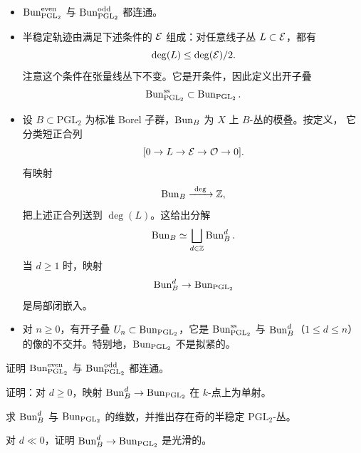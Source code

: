 \begin{itemize}
\item \(\operatorname{Bun}_{\mathrm{PGL}_2}^{\mathrm{even}}\) 与 \(\operatorname{Bun}_{\mathrm{PGL}_2}^{\mathrm{odd}}\) 都连通。
\item 半稳定轨迹由满足下述条件的 \(\mathcal{E}\) 组成：对任意线子丛 \(L\subset\mathcal{E}\)，都有
\[
\deg(L)\le\deg(\mathcal{E})/2.
\]
注意这个条件在张量线丛下不变。它是开条件，因此定义出开子叠
\[
\operatorname{Bun}_{\mathrm{PGL}_2}^{\mathrm{ss}}\subset\operatorname{Bun}_{\mathrm{PGL}_2}.
\]
\item 设 \(B\subset\mathrm{PGL}_2\) 为标准 Borel 子群，\(\operatorname{Bun}_B\) 为 \(X\) 上 \(B\)-丛的模叠。按定义，
它分类短正合列
\[
[0\to L\to\mathcal{E}\to\mathcal{O}\to 0].
\]
有映射
\[
\Bun_B\xrightarrow{\ \deg\ }\Z,
\]
把上述正合列送到 \(\deg(L)\)。这给出分解
\[
\operatorname{Bun}_B\simeq\bigsqcup_{d\in\mathbb{Z}}\operatorname{Bun}^d_B.
\]
当 \(d\ge 1\) 时，映射
\[
\operatorname{Bun}^d_B\to\operatorname{Bun}_{\mathrm{PGL}_2}
\]
是局部闭嵌入。
\item 对 \(n\ge 0\)，有开子叠 \(U_n\subset\operatorname{Bun}_{\mathrm{PGL}_2}\)，它是 \(\operatorname{Bun}^{\mathrm{ss}}_{\mathrm{PGL}_2}\)
与 \(\operatorname{Bun}^d_B\)（\(1\le d\le n\)）的像的不交并。特别地，\(\operatorname{Bun}_{\mathrm{PGL}_2}\) 不是拟紧的。
\end{itemize}

\begin{exercise}\label{ex:connected}
证明 \(\operatorname{Bun}_{\mathrm{PGL}_2}^{\mathrm{even}}\) 与 \(\operatorname{Bun}_{\mathrm{PGL}_2}^{\mathrm{odd}}\) 都连通。
\end{exercise}

\begin{exercise}\label{ex:inj}
证明：对 \(d\ge 0\)，映射 \(\operatorname{Bun}^d_B\to\operatorname{Bun}_{\mathrm{PGL}_2}\) 在 \(k\)-点上为单射。
\end{exercise}

\begin{exercise}\label{ex:dim}
求 \(\operatorname{Bun}^d_B\) 与 \(\operatorname{Bun}_{\mathrm{PGL}_2}\) 的维数，并推出存在奇的半稳定 \(\mathrm{PGL}_2\)-丛。
\end{exercise}

\begin{exercise}\label{ex:smooth}
对 \(d\ll 0\)，证明 \(\operatorname{Bun}^d_B\to\operatorname{Bun}_{\mathrm{PGL}_2}\) 是光滑的。
\end{exercise}
